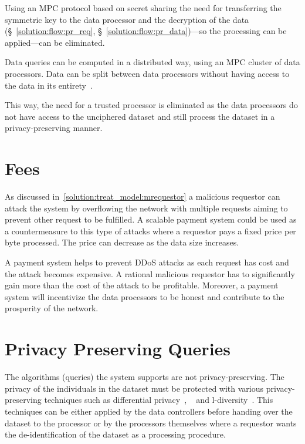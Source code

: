 Using an MPC protocol based on secret sharing the need for transferring the symmetric key to the data processor and the decryption of the data (§~\ref{solution:flow:pr_req}, §~\ref{solution:flow:pr_data})---so the processing can be applied---can be eliminated.

Data queries can be computed in a distributed way, using an MPC cluster of data processors. Data can be split between data processors without having access to the data in its entirety~\cite{DBLP:journals/corr/ZyskindNP15}.

This way, the need for a trusted processor is eliminated as the data processors do not have access to the unciphered dataset and still process the dataset in a privacy-preserving manner.

\section{Fees}
\label{future_work:fees}

As discussed in~\ref{solution:treat_model:mrequestor} a malicious requestor can attack the system by overflowing the network with multiple requests aiming to prevent other request to be fulfilled. A scalable payment system could be used as a countermeasure to this type of attacks where a requestor pays a fixed price per byte processed. The price can decrease as the data size increases.

A payment system helps to prevent DDoS attacks as each request has cost and the attack becomes expensive. A rational malicious requestor has to significantly gain more than the cost of the attack to be profitable. Moreover, a payment system will incentivize the data processors to be honest and contribute to the prosperity of the network.

\section{Privacy Preserving Queries}
\label{future_work:ppq}

The algorithms (queries) the system supports are not privacy-preserving. The privacy of the individuals in the dataset must be protected with various privacy-preserving techniques such as differential privacy~\cite{differential_privacy}, ~\cite{Samarati98protectingprivacy} and l-diversity~\cite{Aggarwal2008}. This techniques can be either applied by the data controllers before handing over the dataset to the processor or by the processors themselves where a requestor wants the de-identification of the dataset as a processing procedure.

